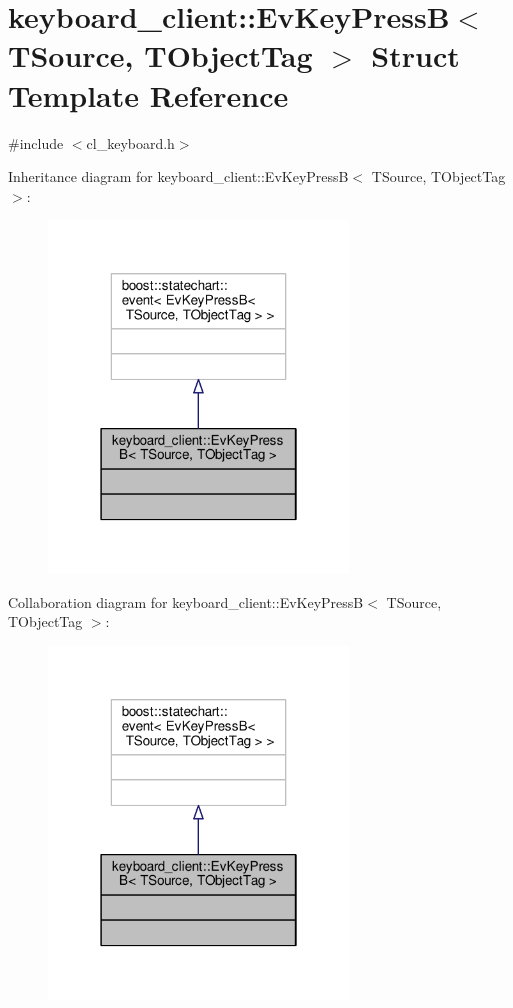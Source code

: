 \hypertarget{structkeyboard__client_1_1EvKeyPressB}{}\section{keyboard\+\_\+client\+:\+:Ev\+Key\+PressB$<$ T\+Source, T\+Object\+Tag $>$ Struct Template Reference}
\label{structkeyboard__client_1_1EvKeyPressB}


{\ttfamily \#include $<$cl\+\_\+keyboard.\+h$>$}



Inheritance diagram for keyboard\+\_\+client\+:\+:Ev\+Key\+PressB$<$ T\+Source, T\+Object\+Tag $>$\+:\nopagebreak
\begin{figure}[H]
\begin{center}
\leavevmode
\includegraphics[width=226pt]{structkeyboard__client_1_1EvKeyPressB__inherit__graph}
\end{center}
\end{figure}


Collaboration diagram for keyboard\+\_\+client\+:\+:Ev\+Key\+PressB$<$ T\+Source, T\+Object\+Tag $>$\+:\nopagebreak
\begin{figure}[H]
\begin{center}
\leavevmode
\includegraphics[width=226pt]{structkeyboard__client_1_1EvKeyPressB__coll__graph}
\end{center}
\end{figure}


